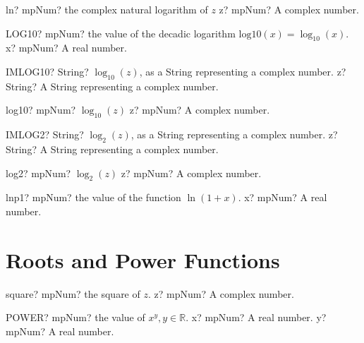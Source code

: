 \documentclass[12pt,a4paper,openany]{book}
\begin{document}
\begin{mpFunctionsExtract}
\mpFunctionOne
{ln? mpNum? the complex natural logarithm of $z$}
{z? mpNum? A complex number.}
\end{mpFunctionsExtract}

\begin{mpFunctionsExtract}
\mpWorksheetFunctionOneNotImplemented
{LOG10? mpNum? the value of the decadic logarithm $\text{log10}(x) = \log_{10}(x)$.}
{x? mpNum? A real number.}
\end{mpFunctionsExtract}

\begin{mpFunctionsExtract}
\mpWorksheetFunctionOneNotImplemented
{IMLOG10? String? $\log_{10}(z)$, as a String representing a complex number.}
{z? String? A String representing a complex number.}
\end{mpFunctionsExtract}

\begin{mpFunctionsExtract}
\mpFunctionOne
{log10? mpNum? $\log_{10}(z)$}
{z? mpNum? A complex number.}
\end{mpFunctionsExtract}

\begin{mpFunctionsExtract}
\mpWorksheetFunctionOneNotImplemented
{IMLOG2? String? $\log_{2}(z)$, as a String representing a complex number.}
{z? String? A String representing a complex number.}
\end{mpFunctionsExtract}

\begin{mpFunctionsExtract}
\mpFunctionOne
{log2? mpNum? $\log_{2}(z)$}
{z? mpNum? A complex number.}
\end{mpFunctionsExtract}

\begin{mpFunctionsExtract}
\mpFunctionOne
{lnp1? mpNum? the value of the function $\ln(1+x)$.}
{x? mpNum? A real number.}
\end{mpFunctionsExtract}

\section{Roots and Power Functions}

\begin{mpFunctionsExtract}
\mpFunctionOne
{square? mpNum? the square of $z$.}
{z? mpNum? A complex number.}
\end{mpFunctionsExtract}

\begin{mpFunctionsExtract}
\mpWorksheetFunctionTwoNotImplemented
{POWER? mpNum? the value of $x^y, y \in  \mathbb{R}$.}
{x? mpNum? A real number.}
{y? mpNum? A real number.}
\end{mpFunctionsExtract}
\end{document}
